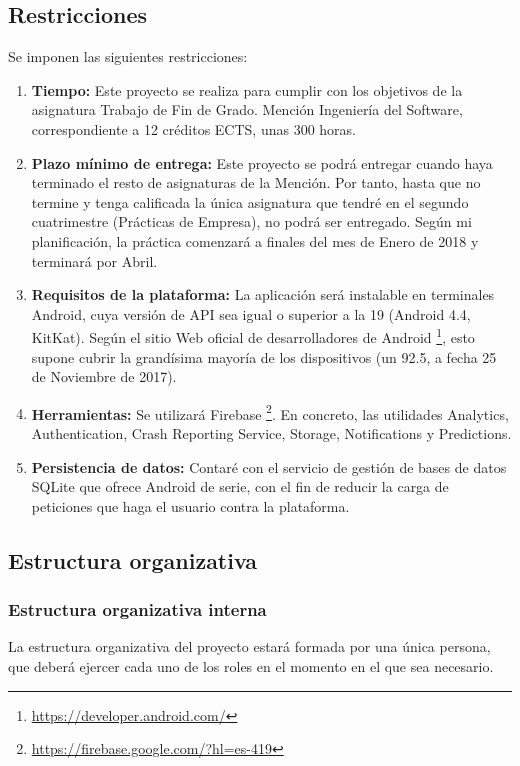 \documentclass[twoside]{report}
\begin{document}
\subsection{Restricciones}
Se imponen las siguientes restricciones:
\begin{enumerate}
\item \textbf{Tiempo:} Este proyecto se realiza para cumplir con los objetivos de la asignatura Trabajo de Fin de Grado. Mención Ingeniería del Software, correspondiente a 12 créditos ECTS, unas 300 horas.

\item \textbf{Plazo mínimo de entrega:} Este proyecto se podrá entregar cuando haya terminado el resto de asignaturas de la Mención. Por tanto, hasta que no termine y tenga calificada la única asignatura que tendré en el segundo cuatrimestre (Prácticas de Empresa), no podrá ser entregado. Según mi planificación, la práctica comenzará a finales del mes de Enero de 2018 y terminará por Abril.

\item \textbf{Requisitos de la plataforma:} La aplicación será instalable en terminales Android, cuya versión de API sea igual o superior a la 19 (Android 4.4, KitKat). Según el sitio Web oficial de desarrolladores de Android \footnote{\url{https://developer.android.com/}}, esto supone cubrir la grandísima mayoría de los dispositivos (un 92.5, a fecha 25 de Noviembre de 2017)\cite{androidversiondist}.

\item \textbf{Herramientas:} Se utilizará Firebase \footnote{\url{https://firebase.google.com/?hl=es-419}}. En concreto, las utilidades Analytics, Authentication, Crash Reporting Service, Storage, Notifications y Predictions.

\item \textbf{Persistencia de datos: } Contaré con el servicio de gestión de bases de datos SQLite que ofrece Android de serie, con el fin de reducir la carga de peticiones que haga el usuario contra la plataforma.
\end{enumerate}

\subsection{Estructura organizativa}
\subsubsection{Estructura organizativa interna}
La estructura organizativa del proyecto estará formada por una única persona, que deberá ejercer cada uno de los roles en el momento en el que sea necesario. \cite{upedu} \vspace{0.5cm}
\end{document}
